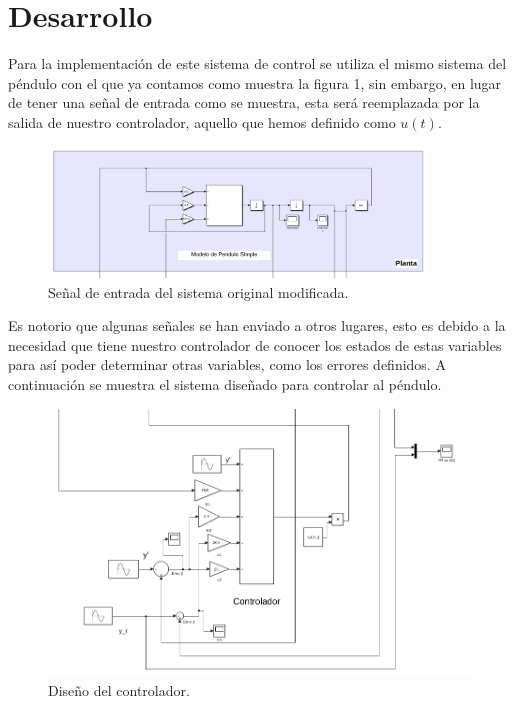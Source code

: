 \documentclass[12pt, letterpaper]{article}
\begin{document}
\section*{Desarrollo}

Para la implementación de este sistema de control se utiliza el mismo sistema del péndulo con el que ya contamos como muestra la figura 1, sin embargo, en lugar de tener una señal de entrada como se muestra, esta será reemplazada por la salida de nuestro controlador, aquello que hemos definido como $u(t)$.

\begin{figure}[H]
	\centering
	\includegraphics[width=0.9\textwidth]{plant.png}
	\caption{Señal de entrada del sistema original modificada.}
\end{figure}

Es notorio que algunas señales se han enviado a otros lugares, esto es debido a la necesidad que tiene nuestro controlador de conocer los estados de estas variables para así poder determinar otras variables, como los errores definidos. A continuación se muestra el sistema diseñado para controlar al péndulo.

\begin{figure}[H]
	\centering
	\includegraphics[width=\textwidth]{controller.png}
	\caption{Diseño del controlador.}
\end{figure}
\end{document}
